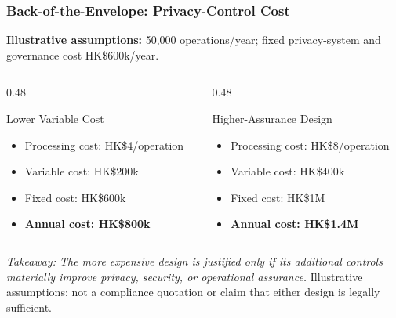\documentclass{beamer}
\begin{document}
\begin{frame}[t,shrink=11]
\frametitle{Back-of-the-Envelope: Privacy-Control Cost}
\textbf{Illustrative assumptions:} 50,000 operations/year; fixed privacy-system and governance cost HK\$600k/year.
\begin{columns}[T]
\begin{column}{0.48\textwidth}\begin{block}{Lower Variable Cost}
\begin{itemize}
\item Processing cost: HK\$4/operation
\item Variable cost: HK\$200k
\item Fixed cost: HK\$600k
\item \textbf{Annual cost: HK\$800k}
\end{itemize}\end{block}\end{column}
\begin{column}{0.48\textwidth}\begin{block}{Higher-Assurance Design}
\begin{itemize}
\item Processing cost: HK\$8/operation
\item Variable cost: HK\$400k
\item Fixed cost: HK\$1M
\item \textbf{Annual cost: HK\$1.4M}
\end{itemize}\end{block}\end{column}
\end{columns}
\textit{Takeaway: The more expensive design is justified only if its additional controls materially improve privacy, security, or operational assurance.}
\vfill{\tiny Illustrative assumptions; not a compliance quotation or claim that either design is legally sufficient.}
\end{frame}
\end{document}
